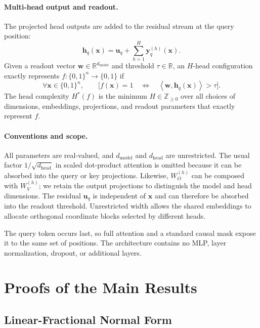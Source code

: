 \documentclass{article}
\theoremstyle{definition}
\theoremstyle{plain}
\newcommand{\hstar}{H^{\ast}}
\newcommand{\bits}{\{0,1\}}
\begin{document}
\paragraph{Multi-head output and readout.}
The projected head outputs are added to the residual stream at the query position:
\begin{equation}
\mathbf{h}_q(\mathbf{x})
=\mathbf{u}_q+\sum_{h=1}^{H}\mathbf{y}_q^{(h)}(\mathbf{x}).
\label{eq:app-multihead-output}
\end{equation}
Given a readout vector $\mathbf{w}\in\mathbb{R}^{d_{\mathrm{model}}}$ and threshold $\tau\in\mathbb{R}$, an $H$-head configuration exactly represents $f:\bits^n\to\bits$ if
\begin{equation}
\forall\mathbf{x}\in\bits^n,\qquad
\bigl[f(\mathbf{x})=1
\quad\Longleftrightarrow\quad
\left\langle\mathbf{w},\mathbf{h}_q(\mathbf{x})\right\rangle>\tau\bigr].
\label{eq:app-linear-readout}
\end{equation}
The head complexity $\hstar(f)$ is the minimum $H\in\mathbb{Z}_{\geq0}$ over all choices of dimensions, embeddings, projections, and readout parameters that exactly represent $f$.

\paragraph{Conventions and scope.}
All parameters are real-valued, and $d_{\mathrm{model}}$ and $d_{\mathrm{head}}$ are unrestricted. The usual factor $1/\sqrt{d_{\mathrm{head}}}$ in scaled dot-product attention is omitted because it can be absorbed into the query or key projections. Likewise, $W_O^{(h)}$ can be composed with $W_V^{(h)}$; we retain the output projections to distinguish the model and head dimensions. The residual $\mathbf{u}_q$ is independent of $\mathbf{x}$ and can therefore be absorbed into the readout threshold. Unrestricted width allows the shared embeddings to allocate orthogonal coordinate blocks selected by different heads.

The query token occurs last, so full attention and a standard causal mask expose it to the same set of positions. The architecture contains no MLP, layer normalization, dropout, or additional layers.

\section{Proofs of the Main Results}
\label{app:proofs}

\subsection{Linear-Fractional Normal Form}
\label{app:proof-normal-form}
\end{document}

